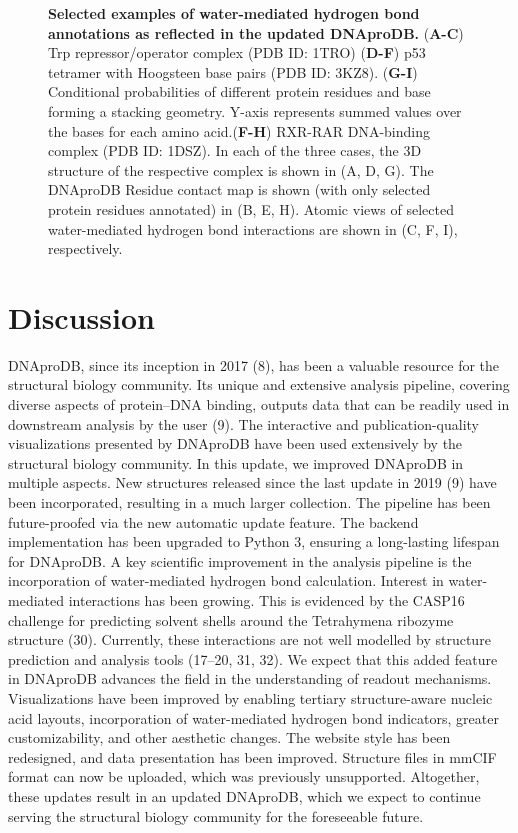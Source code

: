 \begin{center}
    \begin{figure}
        \caption[Water-mediated hydrogen bond annotation in DNAproDB]{\textbf{Selected examples of water-mediated hydrogen bond annotations as reflected in the updated DNAproDB.  } ({\bf A-C}) Trp repressor/operator complex (PDB ID: 1TRO)  ({\bf D-F})    p53 tetramer with Hoogsteen base pairs (PDB ID: 3KZ8). ({\bf G-I}) Conditional probabilities of different protein residues and base forming a stacking geometry. Y-axis represents summed values over the bases for each amino acid.({\bf F-H}) RXR-RAR DNA-binding complex (PDB ID: 1DSZ). In each of the three cases, the 3D structure of the respective complex is shown in (A, D, G). The DNAproDB Residue contact map is shown (with only selected protein residues annotated) in (B, E, H). Atomic views of selected water-mediated hydrogen bond interactions are shown in (C, F, I), respectively. }
  \label{fig:dnaprodb3}
\end{figure}
\end{center}


\section{Discussion}
DNAproDB, since its inception in 2017 (8), has been a valuable resource for the structural biology community. Its unique and extensive analysis pipeline, covering diverse aspects of protein–DNA binding, outputs data that can be readily used in downstream analysis by the user (9). The interactive and publication-quality visualizations presented by DNAproDB have been used extensively by the structural biology community. In this update, we improved DNAproDB in multiple aspects. New structures released since the last update in 2019 (9) have been incorporated, resulting in a much larger collection. The pipeline has been future-proofed via the new automatic update feature. The backend implementation has been upgraded to Python 3, ensuring a long-lasting lifespan for DNAproDB. 
A key scientific improvement in the analysis pipeline is the incorporation of water-mediated hydrogen bond calculation. Interest in water-mediated interactions has been growing. This is evidenced by the CASP16 challenge for predicting solvent shells around the Tetrahymena ribozyme structure (30). Currently, these interactions are not well modelled by structure prediction and analysis tools (17–20, 31, 32). We expect that this added feature in DNAproDB advances the field in the understanding of readout mechanisms. 
Visualizations have been improved by enabling tertiary structure-aware nucleic acid layouts, incorporation of water-mediated hydrogen bond indicators, greater customizability, and other aesthetic changes. The website style has been redesigned, and data presentation has been improved. Structure files in mmCIF format can now be uploaded, which was previously unsupported. Altogether, these updates result in an updated DNAproDB, which we expect to continue serving the structural biology community for the foreseeable future.

